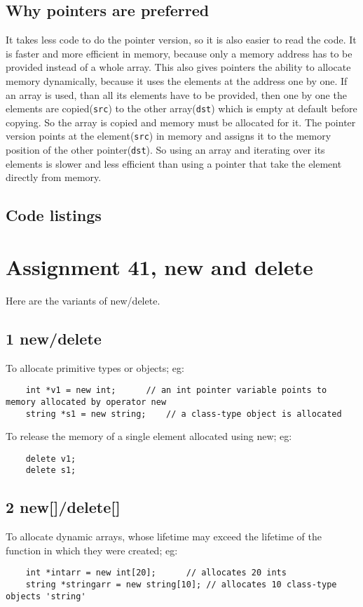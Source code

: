 \documentclass[11pt]{article}
\begin{document}
\subsection{Why pointers are preferred}
It takes less code to do the pointer version, so it is also easier to read the code.
It is faster and more efficient in memory, because only a memory address has to be provided instead of a whole array.
This also gives pointers the ability to allocate memory dynamically, because it uses the elements at the address one by one.
If an array is used, than all its elements have to be provided, then one by one the elements are copied(\texttt{src}) to the other array(\texttt{dst})
which is empty at default before copying. So the array is copied and memory must be allocated for it. 
The pointer version points at the element(\texttt{src}) in memory and assigns it to the memory position of the other pointer(\texttt{dst}).
So using an array and iterating over its elements is slower and less efficient than using a pointer that take the element directly from memory.


\subsection*{Code listings}


\section*{Assignment 41, new and delete}
Here are the variants of new/delete.

\subsection*{1 new/delete}
To allocate primitive types or objects; eg:
\begin{lstlisting}
	int *v1 = new int;		// an int pointer variable points to memory allocated by operator new
	string *s1 = new string;	// a class-type object is allocated
\end{lstlisting}

To release the memory of a single element allocated using new; eg:
\begin{lstlisting}
	delete v1;
	delete s1;
\end{lstlisting}

\subsection*{2 new[]/delete[]}
To allocate dynamic arrays, whose lifetime may exceed the lifetime of the function in which they were created; eg:
\begin{lstlisting}
	int *intarr = new int[20];		// allocates 20 ints
	string *stringarr = new string[10];	// allocates 10 class-type objects 'string'
\end{lstlisting}
\end{document}
